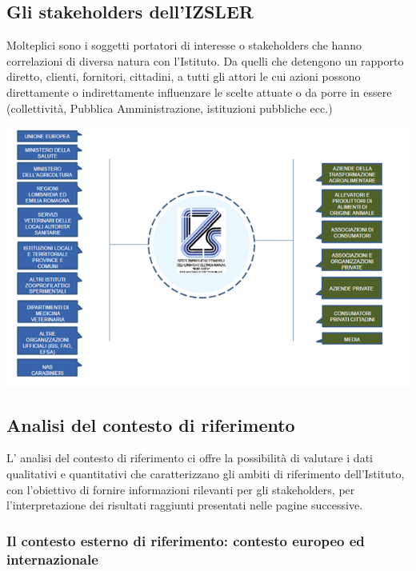 \documentclass[
  12pt,
]{article}
\begin{document}
\hypertarget{gli-stakeholders-dellizsler}{%
\subsection{Gli stakeholders
dell'IZSLER}\label{gli-stakeholders-dellizsler}}

Molteplici sono i soggetti portatori di interesse o stakeholders che
hanno correlazioni di diversa natura con l'Istituto. Da quelli che
detengono un rapporto diretto, clienti, fornitori, cittadini, a tutti
gli attori le cui azioni possono direttamente o indirettamente
influenzare le scelte attuate o da porre in essere (collettività,
Pubblica Amministrazione, istituzioni pubbliche ecc.)

\begin{center}\includegraphics[width=0.9\linewidth]{figure/f1} \end{center}

\newpage

\hypertarget{analisi-del-contesto-di-riferimento}{%
\subsection{Analisi del contesto di
riferimento}\label{analisi-del-contesto-di-riferimento}}

L' analisi del contesto di riferimento ci offre la possibilità di
valutare i dati qualitativi e quantitativi che caratterizzano gli ambiti
di riferimento dell'Istituto, con l'obiettivo di fornire informazioni
rilevanti per gli stakeholders, per l'interpretazione dei risultati
raggiunti presentati nelle pagine successive.

\hypertarget{il-contesto-esterno-di-riferimento-contesto-europeo-ed-internazionale}{%
\subsubsection{Il contesto esterno di riferimento: contesto europeo ed
internazionale}\label{il-contesto-esterno-di-riferimento-contesto-europeo-ed-internazionale}}
\end{document}
